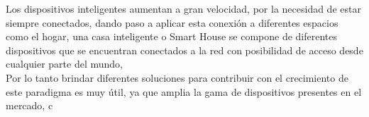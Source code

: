 Los dispositivos inteligentes aumentan a gran velocidad, por la necesidad de estar siempre conectados, dando paso a aplicar esta conexión a diferentes espacios como el hogar, una casa inteligente o Smart House se compone de diferentes dispositivos que se encuentran conectados a la red con posibilidad de acceso desde cualquier parte del mundo, \\

Por lo tanto brindar diferentes soluciones para contribuir con el crecimiento de este paradigma es muy útil, ya que amplia la gama de dispositivos presentes en el mercado, c